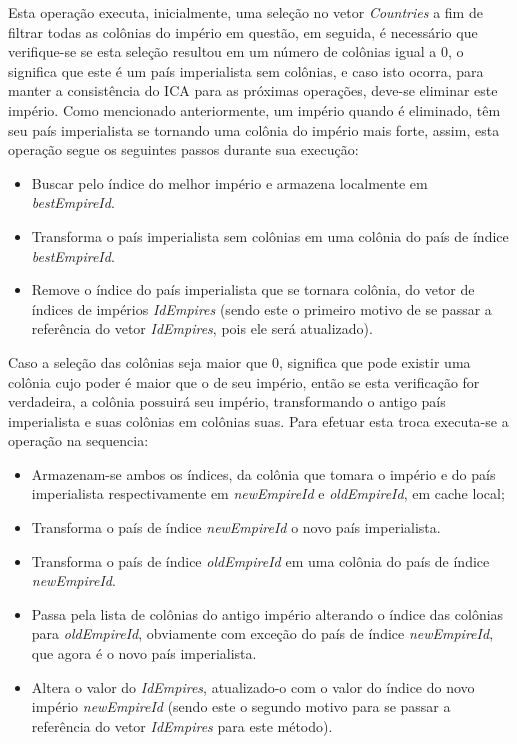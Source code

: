 Esta operação executa, inicialmente, uma seleção no vetor \emph{Countries} a fim de filtrar todas as colônias do império em questão, em seguida, é necessário que verifique-se se esta seleção resultou em um número de colônias igual a 0, o significa que este é um país imperialista sem colônias, e caso isto ocorra, para manter a consistência do ICA para as próximas operações, deve-se eliminar este império. Como mencionado anteriormente, um império quando é eliminado, têm seu país imperialista se tornando uma colônia do império mais forte, assim, esta operação segue os seguintes passos durante sua execução:
\begin{itemize}
\item Buscar pelo índice do melhor império e armazena localmente em \emph{bestEmpireId}.
\item Transforma o país imperialista sem colônias em uma colônia do país de índice \emph{bestEmpireId}.
\item Remove o índice do país imperialista que se tornara colônia, do vetor de índices de impérios \emph{IdEmpires} (sendo este o primeiro motivo de se passar a referência do vetor \emph{IdEmpires}, pois ele será atualizado). 
\end{itemize}

Caso a seleção das colônias seja maior que 0, significa que pode existir uma colônia cujo poder é maior que o de seu império, então se esta verificação for verdadeira, a colônia possuirá seu império, transformando o antigo país imperialista e suas colônias em colônias suas. Para efetuar esta troca executa-se a operação na sequencia:

\begin{itemize}
\item Armazenam-se ambos os índices, da colônia que tomara o império e do país imperialista respectivamente em \emph{newEmpireId} e \emph{oldEmpireId},  em cache local;
\item Transforma o país de índice \emph{newEmpireId} o novo país imperialista.
\item Transforma o país de índice \emph{oldEmpireId} em uma colônia do país de índice \emph{newEmpireId}.
\item Passa pela lista de colônias do antigo império alterando o índice das colônias para \emph{oldEmpireId}, obviamente com exceção do país de índice \emph{newEmpireId}, que agora é o novo país imperialista.   
\item Altera o valor do \emph{IdEmpires}, atualizado-o com o valor do índice do novo império \emph{newEmpireId} (sendo este o segundo motivo para se passar a referência do vetor \emph{IdEmpires} para este método).
\end{itemize}

